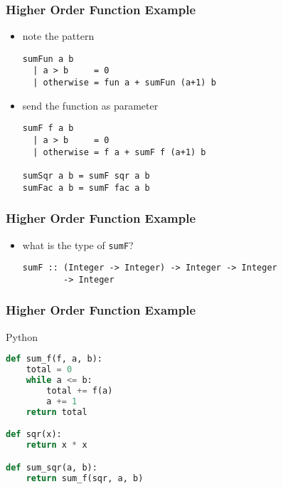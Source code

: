 \documentclass[dvipsnames]{beamer}
\theoremstyle{plain}
\begin{document}
\begin{frame}[fragile]
  \frametitle{Higher Order Function Example}

  \begin{exampleblock}{}
    \begin{itemize}
      \item note the pattern

      \smallskip
      \begin{lstlisting}
sumFun a b
  | a > b     = 0
  | otherwise = fun a + sumFun (a+1) b
      \end{lstlisting}
    \end{itemize}
  \end{exampleblock}

  \pause
  \begin{exampleblock}{}
    \begin{itemize}
      \item send the function as parameter

      \smallskip
      \begin{lstlisting}
sumF f a b
  | a > b     = 0
  | otherwise = f a + sumF f (a+1) b

sumSqr a b = sumF sqr a b
sumFac a b = sumF fac a b
      \end{lstlisting}
    \end{itemize}
  \end{exampleblock}
\end{frame}

\begin{frame}[fragile]
  \frametitle{Higher Order Function Example}

  \begin{exampleblock}{}
    \begin{itemize}
      \item what is the type of \lstinline{sumF}?

      \smallskip
      \begin{lstlisting}
sumF :: (Integer -> Integer) -> Integer -> Integer
        -> Integer
      \end{lstlisting}
    \end{itemize}
  \end{exampleblock}
\end{frame}

\begin{frame}[fragile]
  \frametitle{Higher Order Function Example}

  \begin{exampleblock}{Python}
    \begin{lstlisting}[language=python]
def sum_f(f, a, b):
    total = 0
    while a <= b:
        total += f(a)
        a += 1
    return total

def sqr(x):
    return x * x

def sum_sqr(a, b):
    return sum_f(sqr, a, b)
    \end{lstlisting}
  \end{exampleblock}
\end{frame}
\end{document}
